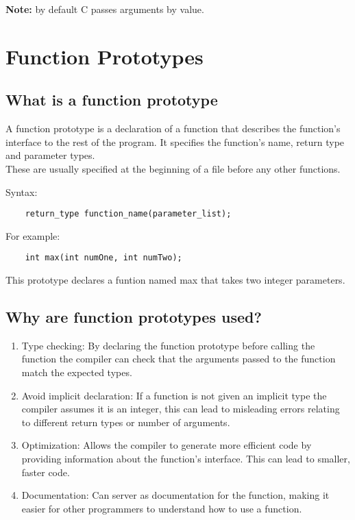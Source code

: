 \documentclass[
	12pt, %
]{fphw}
\begin{document}
\begin{problem}
	
\end{problem}

\textbf{Note:} by default C passes arguments by value.

\clearpage

\section*{Function Prototypes}

\subsection*{What is a function prototype}
A function prototype is a declaration of a function that describes the function's
interface to the rest of the program. It specifies the function's name, return
type and parameter types.\\

These are usually specified at the beginning of a file before any other functions.

Syntax:
\begin{lstlisting}
	return_type function_name(parameter_list);
\end{lstlisting}

For example:
\begin{lstlisting}
	int max(int numOne, int numTwo);
\end{lstlisting}
This prototype declares a funtion named max that takes two integer parameters.

\subsection*{Why are function prototypes used?}

\begin{enumerate}
	\item Type checking: By declaring the function prototype before calling the 
		function the compiler can check that the arguments passed to the function 
		match the expected types.
	\item Avoid implicit declaration: If a function is not given an implicit type 
		the compiler assumes it is an integer, this can lead to misleading errors 
		relating to different return types or number of arguments.
	\item Optimization: Allows the compiler to generate more efficient code by
		providing information about the function's interface. This can lead to
		smaller, faster code.
	\item Documentation: Can server as documentation for the function, making
		it easier for other programmers to understand how to use a function.
\end{enumerate}
\end{document}
